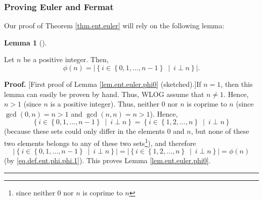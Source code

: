 \documentclass[numbers=enddot,12pt,final,onecolumn,notitlepage]{scrartcl}%
\numberwithin{exer}{subsection}
\theoremstyle{definition}
\newtheorem{lem}[theo]{Lemma}
\newenvironment{lemma}[1][]
{\begin{lem}[#1]\begin{leftbar}}
{\end{leftbar}\end{lem}}
\newenvironment{proof}[1][Proof]{\noindent\textbf{#1.} }{\ \rule{0.5em}{0.5em}}
\begin{document}
\subsubsection{Proving Euler and Fermat}

Our proof of Theorem \ref{thm.ent.euler} will rely on the following lemma:

\begin{lemma}
\label{lem.ent.euler.phi0}Let $n$ be a positive integer. Then,%
\[
\phi\left(  n\right)  =\left\vert \left\{  i\in\left\{  0,1,\ldots
,n-1\right\}  \ \mid\ i\perp n\right\}  \right\vert .
\]

\end{lemma}

\begin{proof}
[First proof of Lemma \ref{lem.ent.euler.phi0} (sketched).]If $n=1$, then this
lemma can easily be proven by hand. Thus, WLOG assume that $n\neq1$. Hence,
$n>1$ (since $n$ is a positive integer). Thus, neither $0$ nor $n$ is coprime
to $n$ (since $\gcd\left(  0,n\right)  =n>1$ and $\gcd\left(  n,n\right)
=n>1$). Hence,%
\[
\left\{  i\in\left\{  0,1,\ldots,n-1\right\}  \ \mid\ i\perp n\right\}
=\left\{  i\in\left\{  1,2,\ldots,n\right\}  \ \mid\ i\perp n\right\}
\]
(because these sets could only differ in the elements $0$ and $n$, but none of
these two elements belongs to any of these two sets\footnote{since neither $0$
nor $n$ is coprime to $n$}), and therefore%
\[
\left\vert \left\{  i\in\left\{  0,1,\ldots,n-1\right\}  \ \mid\ i\perp
n\right\}  \right\vert =\left\vert \left\{  i\in\left\{  1,2,\ldots,n\right\}
\ \mid\ i\perp n\right\}  \right\vert =\phi\left(  n\right)
\]
(by \eqref{eq.def.ent.phi.phi.1}). This proves Lemma \ref{lem.ent.euler.phi0}.
\end{proof}
\end{document}
